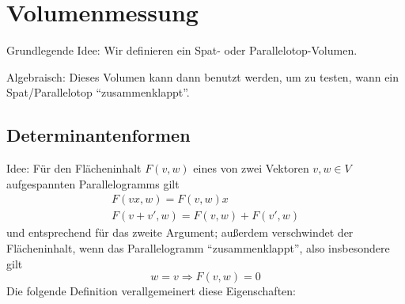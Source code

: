 \chapter{Volumenmessung}
	Grundlegende Idee: Wir definieren ein Spat- oder Parallelotop-Volumen.

	Algebraisch: Dieses Volumen kann dann benutzt werden, um zu testen, wann ein Spat/Parallelotop "`zusammenklappt"'.
\section{Determinantenformen}
	Idee: Für den Flächeninhalt $ F(v,w) $ eines von zwei Vektoren $ v,w\in V $ aufgespannten Parallelogramms gilt
	\begin{gather*}
		F{(vx,w)} = F{(v,w)}x\\
		F(v+v',w) = F(v,w)+F(v',w)
	\end{gather*}
	und entsprechend für das zweite Argument; außerdem verschwindet der Flächeninhalt, wenn das Parallelogramm "`zusammenklappt"', also insbesondere gilt
		\[ w=v\Rightarrow F(v,w)=0 \]
	Die folgende Definition verallgemeinert diese Eigenschaften:



